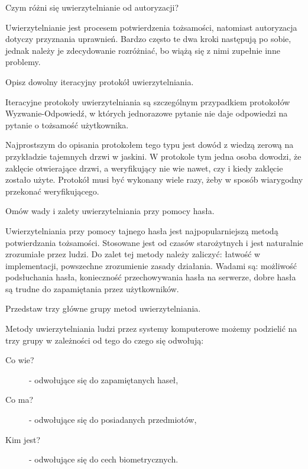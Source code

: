 \documentclass[answers,11pt]{exam}
\begin{document}
\begin{questions}


\question Czym różni się uwierzytelnianie od autoryzacji?
\begin{solution}
Uwierzytelnianie jest procesem potwierdzenia tożsamości, natomiast autoryzacja dotyczy przyznania uprawnień. Bardzo często te dwa kroki następują po sobie, jednak należy je zdecydowanie rozróżniać, bo wiążą się z nimi zupełnie inne problemy.
\end{solution}

\question Opisz dowolny iteracyjny protokół uwierzytelniania.
\begin{solution}
Iteracyjne protokoły uwierzytelniania są szczególnym przypadkiem protokołów Wyzwanie-Odpowiedź, w których jednorazowe pytanie nie daje odpowiedzi na pytanie o tożsamość użytkownika. 

Najprostszym do opisania protokołem tego typu jest dowód z wiedzą zerową na przykładzie tajemnych drzwi w jaskini. W protokole tym jedna osoba dowodzi, że zaklęcie otwierające drzwi, a weryfikujący nie wie nawet, czy i kiedy zaklęcie zostało użyte. Protokół musi być wykonany wiele razy, żeby w sposób wiarygodny przekonać weryfikującego.
\end{solution}

\question Omów wady i zalety uwierzytelniania przy pomocy hasła.
\begin{solution}
Uwierzytelniania przy pomocy tajnego hasła jest najpopularniejszą metodą potwierdzania tożsamości. Stosowane jest od czasów starożytnych i jest naturalnie zrozumiałe przez ludzi. 
Do zalet tej metody należy zaliczyć: łatwość w implementacji, powszechne zrozumienie zasady działania.
Wadami są: możliwość podsłuchania hasła, konieczność przechowywania hasła na serwerze, dobre hasła są trudne do zapamiętania przez użytkowników.
\end{solution}

\question Przedstaw trzy główne grupy metod uwierzytelniania.
\begin{solution}
Metody uwierzytelniania ludzi przez systemy komputerowe możemy podzielić na trzy grupy w zależności od tego do czego się odwołują:
\begin{description}
\item[Co wie?] - odwołujące się do zapamiętanych haseł,
\item[Co ma?] - odwołujące się do posiadanych przedmiotów,
\item[Kim jest?] - odwołujące się do cech biometrycznych.
\end{description}
\end{solution}


\end{questions}
\end{document}
